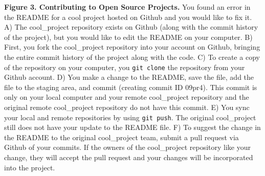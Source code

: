 \textbf{Figure 3. Contributing to Open Source Projects.} You found an error in the README for a cool project hosted on Github and you would like to fix it. A) The cool\_project repository exists on Github (along with the commit history of the project), but you would like to edit the README on your computer. B) First, you fork the cool\_project repository into your account on Github, bringing the entire commit history of the project along with the code. C) To create a copy of the repository on your computer, you \verb|git clone| the repository from your Github account. D) You make a change to the README, save the file, add the file to the staging area, and commit (creating commit ID 09pr4). This commit is only on your local computer and your remote cool\_project repository and the original remote cool\_project repository do not have this commit. E) You sync your local and remote repositories by using \verb|git push|. The original cool\_project still does not have your update to the README file. F) To suggest the change in the README to the original cool\_project team, submit a pull request via Github of your commits. If the owners of the cool\_project repository like your change, they will accept the pull request and your changes will be incorporated into the project. 